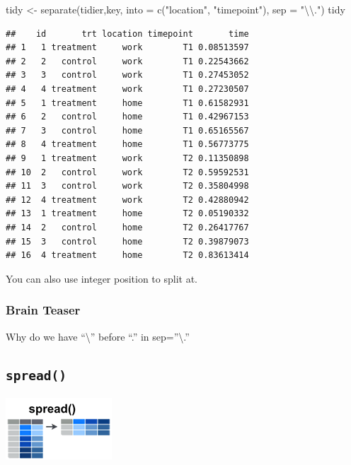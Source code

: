 \documentclass[
]{book}
\newenvironment{Shaded}{\begin{snugshade}}{\end{snugshade}}
\newcommand{\AttributeTok}[1]{\textcolor[rgb]{0.77,0.63,0.00}{#1}}
\newcommand{\FunctionTok}[1]{\textcolor[rgb]{0.00,0.00,0.00}{#1}}
\newcommand{\NormalTok}[1]{#1}
\newcommand{\OtherTok}[1]{\textcolor[rgb]{0.56,0.35,0.01}{#1}}
\newcommand{\SpecialCharTok}[1]{\textcolor[rgb]{0.00,0.00,0.00}{#1}}
\newcommand{\StringTok}[1]{\textcolor[rgb]{0.31,0.60,0.02}{#1}}
\begin{document}
\begin{Shaded}
\begin{Highlighting}[]
\NormalTok{tidy }\OtherTok{\textless{}{-}} \FunctionTok{separate}\NormalTok{(tidier,key, }\AttributeTok{into =} \FunctionTok{c}\NormalTok{(}\StringTok{"location"}\NormalTok{, }\StringTok{"timepoint"}\NormalTok{), }\AttributeTok{sep =} \StringTok{"}\SpecialCharTok{\textbackslash{}\textbackslash{}}\StringTok{."}\NormalTok{)}
\NormalTok{tidy}
\end{Highlighting}
\end{Shaded}

\begin{verbatim}
##    id       trt location timepoint       time
## 1   1 treatment     work        T1 0.08513597
## 2   2   control     work        T1 0.22543662
## 3   3   control     work        T1 0.27453052
## 4   4 treatment     work        T1 0.27230507
## 5   1 treatment     home        T1 0.61582931
## 6   2   control     home        T1 0.42967153
## 7   3   control     home        T1 0.65165567
## 8   4 treatment     home        T1 0.56773775
## 9   1 treatment     work        T2 0.11350898
## 10  2   control     work        T2 0.59592531
## 11  3   control     work        T2 0.35804998
## 12  4 treatment     work        T2 0.42880942
## 13  1 treatment     home        T2 0.05190332
## 14  2   control     home        T2 0.26417767
## 15  3   control     home        T2 0.39879073
## 16  4 treatment     home        T2 0.83613414
\end{verbatim}

You can also use integer position to split at.

\hypertarget{brain-teaser-1}{%
\subsubsection*{Brain Teaser}\label{brain-teaser-1}}

Why do we have ``\textbackslash{}'' before ``.'' in sep=''\textbackslash.''

\hypertarget{spread}{%
\subsection*{\texorpdfstring{\texttt{spread()}}{spread()}}\label{spread}}

\includegraphics{./figures/tidyr-spread.png}
\end{document}
